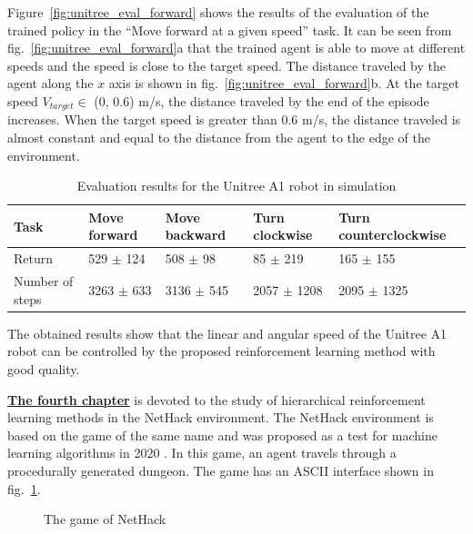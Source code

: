 Figure~\ref{fig:unitree_eval_forward} shows the results of the evaluation of the trained policy in the ``Move forward at a given speed'' task. It can be seen from fig.~\ref{fig:unitree_eval_forward}a that the trained agent is able to move at different speeds and the speed is close to the target speed. The distance traveled by the agent along the $x$ axis is shown in fig.~\ref{fig:unitree_eval_forward}b. At the target speed $V_{target} \in$ (0, 0.6) m/s, the distance traveled by the end of the episode increases. When the target speed is greater than 0.6 m/s, the distance traveled is almost constant and equal to the distance from the agent to the edge of the environment.

\begin{table} [htbp]
    \centering
    \begin{threeparttable}
        \caption{Evaluation results for the Unitree A1 robot in simulation}\label{tab:unitree_eval}
        \begin{tabular}{| p{2cm} || p{2cm} | p{2cm} | p{2cm} |p{2.5cm} |}
            \hline
            \hline
            Task & Move forward & Move backward & Turn clockwise & Turn counterclockwise \\
            \hline
            Return &	529 $\pm$ 124 &	508 $\pm$ 98 &	85 $\pm$ 219 &	165 $\pm$ 155 \\
            Number of steps & 3263 $\pm$ 633 &	3136 $\pm$ 545 &	2057 $\pm$ 1208 &	2095 $\pm$ 1325 \\
            \hline
            \hline
        \end{tabular}
    \end{threeparttable}
\end{table}

The obtained results show that the linear and angular speed of the Unitree A1 robot can be controlled by the proposed reinforcement learning method with good quality.

\underline{\textbf{The fourth chapter}} is devoted to the study of hierarchical reinforcement learning methods in the NetHack environment. The NetHack environment is based on the game of the same name and was proposed as a test for machine learning algorithms in 2020 \cite{nethack}. In this game, an agent travels through a procedurally generated dungeon. The game has an ASCII interface shown in fig.~\ref{fig:nethack}.

\begin{figure}[ht]
    \caption{The game of NetHack}\label{fig:nethack}
\end{figure}

